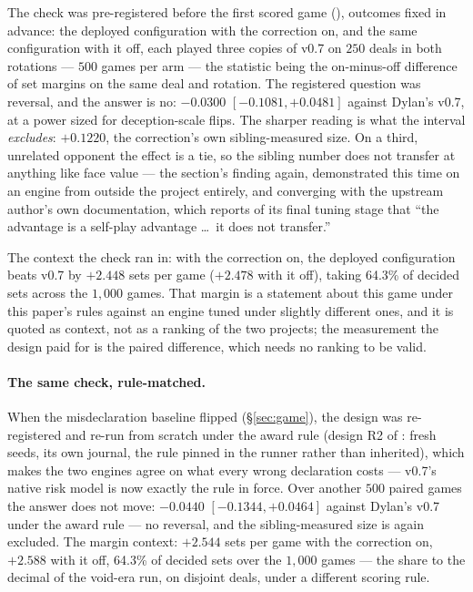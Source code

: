 \documentclass[11pt,a4paper]{article}
\begin{document}
The check was pre-registered before the first scored game
(), outcomes fixed in advance: the
deployed configuration with the correction on, and the same configuration
with it off, each played three copies of v0.7 on $250$ deals in both
rotations --- $500$ games per arm --- the statistic being the on-minus-off
difference of set margins on the same deal and rotation. The registered
question was reversal, and the answer is no: $-0.0300$
$[-0.1081, +0.0481]$ against Dylan's v0.7, at a power sized for
deception-scale flips. The sharper reading is what the interval
\emph{excludes}: $+0.1220$, the correction's own sibling-measured size. On a
third, unrelated opponent the effect is a tie, so the sibling number does not
transfer at anything like face value --- the section's finding again,
demonstrated this time on an engine from outside the project entirely, and
converging with the upstream author's own documentation, which reports of its
final tuning stage that ``the advantage is a self-play advantage \dots\ it
does not transfer.''

The context the check ran in: with the correction on, the deployed
configuration beats v0.7 by $+2.448$ sets per game ($+2.478$ with it off),
taking 64.3\% of decided sets across the $1{,}000$ games. That margin is a
statement about this game under this paper's rules against an engine tuned
under slightly different ones, and it is quoted as context, not as a ranking
of the two projects; the measurement the design paid for is the paired
difference, which needs no ranking to be valid.

\paragraph{The same check, rule-matched.} When the misdeclaration baseline
flipped (\S\ref{sec:game}), the design was re-registered and re-run from
scratch under the award rule (design R2 of
: fresh seeds, its own journal, the
rule pinned in the runner rather than inherited), which makes the two
engines agree on what every wrong declaration costs --- v0.7's native risk
model is now exactly the rule in force. Over another $500$ paired games the
answer does not move: $-0.0440$ $[-0.1344, +0.0464]$ against Dylan's v0.7
under the award rule --- no reversal, and the sibling-measured size is again
excluded. The margin context: $+2.544$ sets per game with the correction on,
$+2.588$ with it off, 64.3\% of decided sets over the $1{,}000$ games ---
the share to the decimal of the void-era run, on disjoint deals, under a
different scoring rule.
\end{document}
